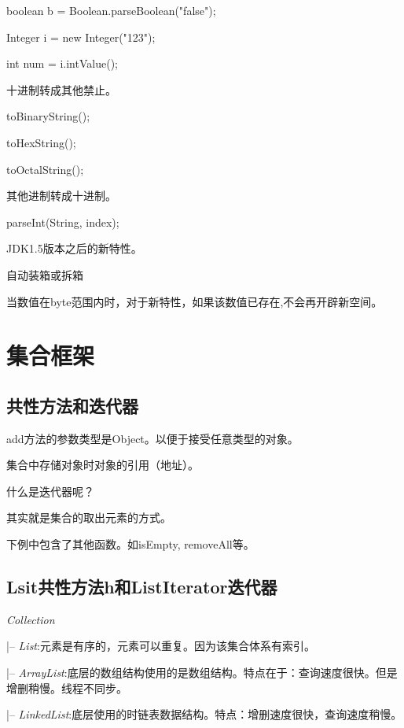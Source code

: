 \documentclass[UTF8]{ctexart}
\begin{document}
\qquad boolean b = Boolean.parseBoolean("false");

\qquad Integer i = new Integer("123");

\qquad int num = i.intValue();

十进制转成其他禁止。

\textbullet toBinaryString();

\textbullet toHexString();

\textbullet toOctalString();

其他进制转成十进制。

\textbullet parseInt(String, index);



JDK1.5版本之后的新特性。

\textbullet 自动装箱或拆箱

\textbullet 当数值在byte范围内时，对于新特性，如果该数值已存在,不会再开辟新空间。



\section{集合框架}
\subsection{共性方法和迭代器}

\textbullet add方法的参数类型是Object。以便于接受任意类型的对象。

\textbullet 集合中存储对象时对象的引用（地址）。

什么是迭代器呢？

其实就是集合的取出元素的方式。

下例中包含了其他函数。如isEmpty, removeAll等。


\subsection{Lsit共性方法h和ListIterator迭代器}

\textit{Collection}

\qquad |-- \textit{List}:元素是有序的，元素可以重复。因为该集合体系有索引。

\qquad \qquad |-- \textit{ArrayList}:底层的数组结构使用的是数组结构。特点在于：查询速度很快。但是增删稍慢。线程不同步。

\qquad \qquad |-- \textit{LinkedList}:底层使用的时链表数据结构。特点：增删速度很快，查询速度稍慢。
\end{document}
